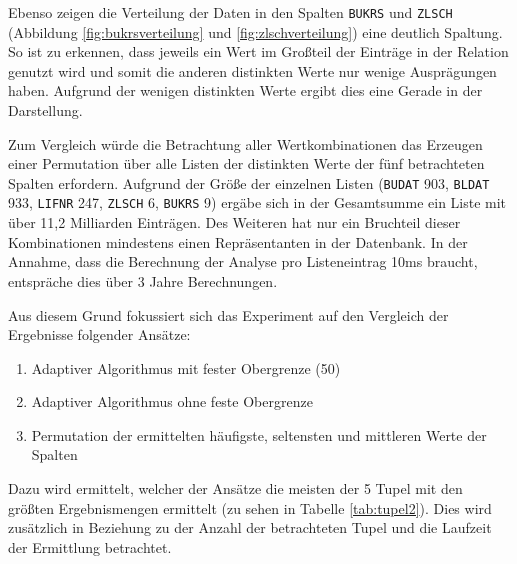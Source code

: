 Ebenso zeigen die Verteilung der Daten in den Spalten \texttt{BUKRS} und \texttt{ZLSCH} (Abbildung \ref{fig:bukrsverteilung} und \ref{fig:zlschverteilung}) eine deutlich Spaltung.
So ist zu erkennen, dass jeweils ein Wert im Großteil der Einträge in der Relation genutzt wird und somit die anderen distinkten Werte nur wenige Ausprägungen haben.
Aufgrund der wenigen distinkten Werte ergibt dies eine Gerade in der Darstellung.

Zum Vergleich würde die Betrachtung aller Wertkombinationen das Erzeugen einer Permutation über alle Listen der distinkten Werte der fünf betrachteten Spalten erfordern.
Aufgrund der Größe der einzelnen Listen (\texttt{BUDAT} 903, \texttt{BLDAT} 933, \texttt{LIFNR} 247, \texttt{ZLSCH} 6, \texttt{BUKRS} 9) ergäbe sich in der Gesamtsumme ein Liste mit über 11,2 Milliarden Einträgen.
Des Weiteren hat nur ein Bruchteil dieser Kombinationen mindestens einen Repräsentanten in der Datenbank.
In der Annahme, dass die Berechnung der Analyse pro Listeneintrag 10ms braucht, entspräche dies über 3 Jahre Berechnungen.

Aus diesem Grund fokussiert sich das Experiment auf den Vergleich der Ergebnisse folgender Ansätze:

   \begin{enumerate}
      \item Adaptiver Algorithmus mit fester Obergrenze (50)
      \item Adaptiver Algorithmus ohne feste Obergrenze
			\item Permutation der ermittelten häufigste, seltensten und mittleren Werte der Spalten
   \end{enumerate}

Dazu wird ermittelt, welcher der Ansätze die meisten der 5 Tupel mit den größten Ergebnismengen ermittelt (zu sehen in Tabelle \ref{tab:tupel2}).
Dies wird zusätzlich in Beziehung zu der Anzahl der betrachteten Tupel und die Laufzeit der Ermittlung betrachtet.

\begin{table}[h]
	\centering
	\caption{Eingabetupel für mit den meisten Ergebnissen}
	\label{tab:tupel2}
\end{table}


